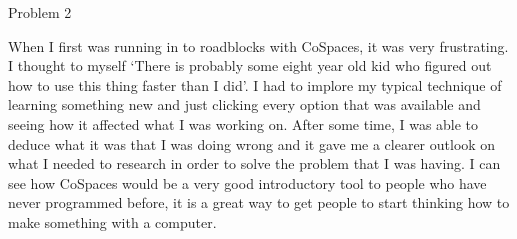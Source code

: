 \begin{problem}{Problem 2}
\begin{highlight}[Response]
        When I first was running in to roadblocks with CoSpaces, it was very frustrating. I thought to myself `There is probably some eight year old kid who figured out how to use this thing faster than I did'.
        I had to implore my typical technique of learning something new and just clicking every option that was available and seeing how it affected what I was working on. After some time, I was able to deduce
        what it was that I was doing wrong and it gave me a clearer outlook on what I needed to research in order to solve the problem that I was having. I can see how CoSpaces would be a very good introductory
        tool to people who have never programmed before, it is a great way to get people to start thinking how to make something with a computer.
    \end{highlight}
\end{problem}

